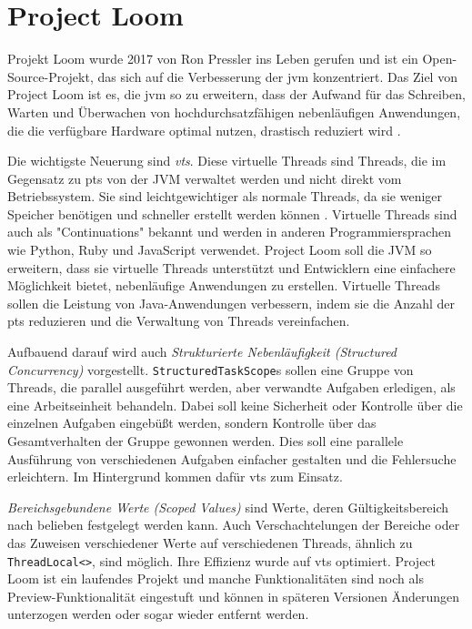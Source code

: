 \chapter{Project Loom}
\label{cha:ProjectLoom}

    Projekt Loom wurde 2017 von Ron Pressler ins Leben gerufen und ist ein Open-Source-Projekt, 
    das sich auf die Verbesserung der \gls{jvm} konzentriert. Das Ziel von Project Loom ist es, 
    die \gls{jvm} so zu erweitern, dass der Aufwand für das Schreiben, Warten und Überwachen von hochdurchsatzfähigen nebenläufigen Anwendungen,
    die die verfügbare Hardware optimal nutzen, drastisch reduziert wird \cite{ProjectLoom}.

    Die wichtigste Neuerung sind \emph{\Glspl{vt}}.
    Diese virtuelle Threads sind Threads, die im Gegensatz zu \Glspl{pt} von der JVM verwaltet werden und nicht direkt vom Betriebssystem. 
    Sie sind leichtgewichtiger als normale Threads, da sie weniger Speicher benötigen und schneller erstellt werden können \cite{JEP444}.
    Virtuelle Threads sind auch als "Continuations" bekannt und werden in anderen Programmiersprachen wie Python, Ruby und JavaScript verwendet.
    Project Loom soll die JVM so erweitern, dass sie virtuelle Threads unterstützt und Entwicklern eine einfachere Möglichkeit bietet,
    nebenläufige Anwendungen zu erstellen. Virtuelle Threads sollen die Leistung von Java-Anwendungen verbessern, indem sie die Anzahl der \Glspl{pt} reduzieren und 
    die Verwaltung von Threads vereinfachen. 

    Aufbauend darauf wird auch \emph{Strukturierte Nebenläufigkeit (Structured Concurrency)} vorgestellt.
    \texttt{StructuredTaskScope}s sollen eine Gruppe von Threads, die parallel ausgeführt werden, aber verwandte Aufgaben erledigen, als eine Arbeitseinheit behandeln. 
    Dabei soll keine Sicherheit oder Kontrolle über die einzelnen Aufgaben eingebüßt werden, sondern Kontrolle über das Gesamtverhalten der Gruppe gewonnen werden.
    Dies soll eine parallele Ausführung von verschiedenen Aufgaben einfacher gestalten und die Fehlersuche erleichtern.
    Im Hintergrund kommen dafür \Glspl{vt} zum Einsatz. \cite{JEP453}

    \emph{Bereichsgebundene Werte (Scoped Values)} sind Werte, deren Gültigkeitsbereich nach belieben festgelegt werden kann.
    Auch Verschachtelungen der Bereiche oder das
    Zuweisen verschiedener Werte auf verschiedenen Threads, ähnlich zu \texttt{ThreadLocal<>}, sind möglich. Ihre Effizienz wurde auf \Glspl{vt} optimiert.
    \cite{JEP481}
    Project Loom ist ein laufendes Projekt und manche Funktionalitäten sind noch als Preview-Funktionalität eingestuft und können in späteren Versionen Änderungen 
    unterzogen werden oder sogar wieder entfernt werden.

